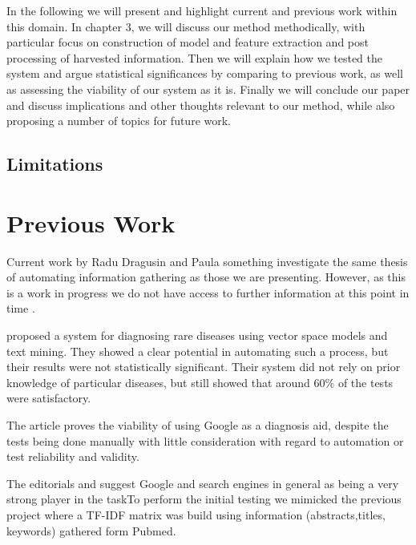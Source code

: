 \documentclass[10pt,letterpaper,draft]{article}
\begin{document}
In the following we will present and highlight current and previous work
within this domain. In chapter 3, we will discuss our method
methodically, with particular focus on construction of model and feature
extraction and post processing of harvested information.
Then we will explain how we tested the system and argue statistical
significances by comparing to previous work, as well as assessing the
viability of our system as it is.
Finally we will conclude our paper and discuss implications and other
thoughts relevant to our method, while also proposing a number of topics
for future work.


\subsection{Limitations}


\section{Previous Work}
Current work by Radu Dragusin and Paula something investigate the same
thesis of automating information gathering as those we are presenting.
However, as this is a work in progress we do not have access to further
information at this point in time \cite{radupaula}.


\cite{jensenandersen} proposed a system for diagnosing rare diseases
using vector space models and text mining. They showed a clear potential
in automating such a process, but their results were not statistically
significant. Their system did not rely on prior knowledge of particular
diseases, but still showed that around 60\% of the tests were
satisfactory.


The article \cite{googlingdiagnosis} proves the viability of using
Google as a diagnosis aid, despite the tests being done manually with
little consideration with regard to automation or test reliability and
validity.



The editorials \cite{googlechangemedicine} and
\cite{diagnosissearchengines} suggest Google and search engines in
general as being a very strong player in the taskTo perform the initial testing we mimicked the previous project where a TF-IDF matrix was build using information (abstracts,titles, keywords) gathered form Pubmed. 
\end{document}
